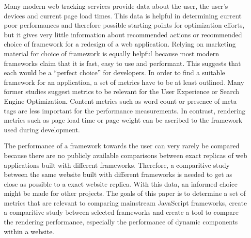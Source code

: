 \documentclass[a4paper, fontsize=11pt]{article}
\begin{document}
Many modern web tracking services provide data about the user, the user's devices and current page load times.
This data is helpful in determining current poor performances and therefore possible starting points for optimization efforts, but it gives very little information about recommended actions or recommended choice of framework for a redesign of a web application.
Relying on marketing material for choice of framework is equally helpful because most modern frameworks claim that it is fast, easy to use and performant.
This suggests that each would be a \enquote{perfect choice} for developers.
In order to find a suitable framework for an application, a set of metrics have to be at least outlined.
Many former studies suggest metrics to be relevant for the User Experience or Search Engine Optimization.
Content metrics such as word count or presence of meta tags are less important for the performance measurements.
In contrast, rendering metrics such as page load time or page weight can be ascribed to the framework used during development.

The performance of a framework towards the user can very rarely be compared because there are no publicly available comparisons between exact replicas of web applications built with different frameworks.
Therefore, a comparitive study between the same website built with different frameworks is needed to get as close as possible to a exact website replica.
With this data, an informed choice might be made for other projects.
The goals of this paper is to determine a set of metrics that are relevant to comparing mainstream JavaScript frameworks, create a comparitive study between selected frameworks and create a tool to compare the rendering performance, especially the performance of dynamic components within a website.





\nocite{*}
{}
\end{document}
